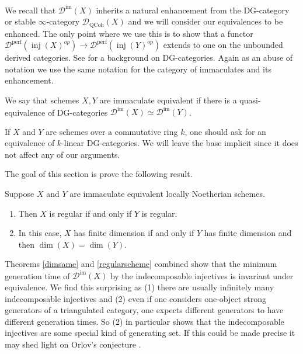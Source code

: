 \documentclass[12pt,oneside]{amsart}
\DeclareMathOperator{\QCoh}{QCoh}
\DeclareMathOperator{\perf}{perf}
\DeclareMathOperator{\inj}{inj}
\DeclareMathOperator{\immac}{im}
\begin{document}
\begin{remark}
We recall that $\mathcal{D}^{\immac}(X)$ inherits a natural enhancement from the DG-category or stable $\infty$-category $\mathcal{D}_{\QCoh}(X)$ and we will consider our equivalences to be enhanced. The only point where we use this is to show that a functor $\mathcal{D}^{\perf}(\inj(X)^{op}) \to \mathcal{D}^{\perf}(\inj(Y)^{op})$ extends to one on the unbounded derived categories. See \cite{kel06} for a background on DG-categories. Again as an abuse of notation we use the same notation for the category of immaculates and its enhancement. 
\end{remark}

\begin{defn}
We say that schemes $X,Y$ are immaculate equivalent if there is a quasi-equivalence of DG-categories $\mathcal{D}^{\immac}(X) \simeq \mathcal{D}^{\immac}(Y)$. 
\end{defn}


\begin{remark}
If $X$ and $Y$ are schemes over a commutative ring $k$, one should ask for an equivalence of $k$-linear DG-categories. We will leave the base implicit since it does not affect any of our arguments. 
\end{remark}

The goal of this section is prove the following result.


\begin{theorem} \label{dimsame}
Suppose $X$ and $Y$ are immaculate equivalent locally Noetherian schemes. 
\begin{enumerate}
\item Then $X$ is regular if and only if $Y$ is regular.
\item In this case, $X$ has finite dimension if and only if $Y$ has finite dimension and then $\dim(X) = \dim(Y)$.
\end{enumerate} 
\end{theorem}

\begin{remark}
Theorems \ref{dimsame} and \ref{regularscheme} combined show that the minimum generation time of $\mathcal{D}^{\immac}(X)$ by the indecomposable injectives is invariant under equivalence. We find this surprising as (1) there are usually infinitely many indecomposable injectives and (2) even if one considers one-object strong generators of a triangulated category, one expects different generators to have different generation times. So (2) in particular shows that the indecomposable injectives are some special kind of generating set. If this could be made precise it may shed light on Orlov's conjecture \cite[Conjecture 10]{Orl09}. 
\end{remark}
\end{document}
